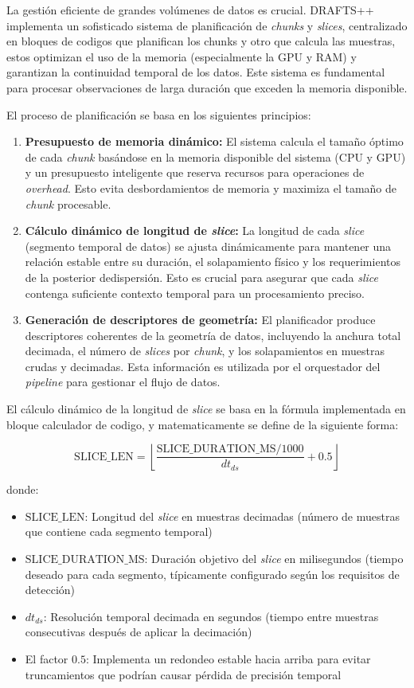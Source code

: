 La gestión eficiente de grandes volúmenes de datos es crucial. DRAFTS++ implementa un sofisticado sistema de planificación de \emph{chunks} y \emph{slices}, centralizado en bloques de codigos que planifican los chunks y otro que calcula las muestras, estos optimizan el uso de la memoria (especialmente la GPU y RAM) y garantizan la continuidad temporal de los datos. Este sistema es fundamental para procesar observaciones de larga duración que exceden la memoria disponible.

El proceso de planificación se basa en los siguientes principios:
\begin{enumerate}
    \item \textbf{Presupuesto de memoria dinámico:} El sistema calcula el tamaño óptimo de cada \emph{chunk} basándose en la memoria disponible del sistema (CPU y GPU) y un presupuesto inteligente que reserva recursos para operaciones de \emph{overhead}. Esto evita desbordamientos de memoria y maximiza el tamaño de \emph{chunk} procesable.
    \item \textbf{Cálculo dinámico de longitud de \emph{slice}:} La longitud de cada \emph{slice} (segmento temporal de datos) se ajusta dinámicamente para mantener una relación estable entre su duración, el solapamiento físico y los requerimientos de la posterior dedispersión. Esto es crucial para asegurar que cada \emph{slice} contenga suficiente contexto temporal para un procesamiento preciso.
    \item \textbf{Generación de descriptores de geometría:} El planificador produce descriptores coherentes de la geometría de datos, incluyendo la anchura total decimada, el número de \emph{slices} por \emph{chunk}, y los solapamientos en muestras crudas y decimadas. Esta información es utilizada por el orquestador del \emph{pipeline} para gestionar el flujo de datos.
\end{enumerate}

El cálculo dinámico de la longitud de \emph{slice} se basa en la fórmula implementada en bloque calculador de codigo, y matematicamente se define de la siguiente forma:

\[
\text{SLICE\_LEN} = \left\lfloor \frac{\text{SLICE\_DURATION\_MS}/1000}{dt_{ds}} + 0.5 \right\rfloor
\]

donde:
\begin{itemize}
    \item $\text{SLICE\_LEN}$: Longitud del \emph{slice} en muestras decimadas (número de muestras que contiene cada segmento temporal)
    \item $\text{SLICE\_DURATION\_MS}$: Duración objetivo del \emph{slice} en milisegundos (tiempo deseado para cada segmento, típicamente configurado según los requisitos de detección)
    \item $dt_{ds}$: Resolución temporal decimada en segundos (tiempo entre muestras consecutivas después de aplicar la decimación)
    \item El factor $0.5$: Implementa un redondeo estable hacia arriba para evitar truncamientos que podrían causar pérdida de precisión temporal
\end{itemize}

